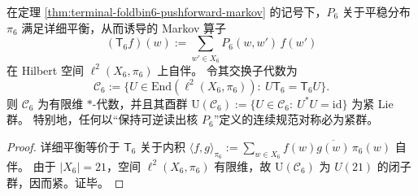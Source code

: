 \begin{corollary}\label{cor:window6-p6-compactness-principle}
在定理 \ref{thm:terminal-foldbin6-pushforward-markov} 的记号下，\(P_6\) 关于平稳分布 \(\pi_6\) 满足详细平衡，从而诱导的 Markov 算子
\[
(\mathsf{T}_6 f)(w):=\sum_{w'\in X_6} P_6(w,w')\,f(w')
\]
在 Hilbert 空间 \(\ell^2(X_6,\pi_6)\) 上自伴。
令其交换子代数为
\[
\mathcal{C}_6:=\bigl\{U\in \mathrm{End}(\ell^2(X_6,\pi_6)):\ U\mathsf{T}_6=\mathsf{T}_6U\bigr\}.
\]
则 \(\mathcal{C}_6\) 为有限维 \(*\)-代数，并且其酉群
\(
\mathrm{U}(\mathcal{C}_6):=\{U\in\mathcal{C}_6:\ U^*U=\mathrm{id}\}
\)
为紧 Lie 群。
特别地，任何以“保持可逆读出核 \(P_6\)”定义的连续规范对称必为紧群。
\end{corollary}
\begin{proof}
详细平衡等价于 \(\mathsf{T}_6\) 关于内积 \(\langle f,g\rangle_{\pi_6}:=\sum_{w\in X_6} f(w)\overline{g(w)}\,\pi_6(w)\) 自伴。
由于 \(|X_6|=21\)，空间 \(\ell^2(X_6,\pi_6)\) 有限维，故 \(\mathrm{U}(\mathcal{C}_6)\) 为 \(U(21)\) 的闭子群，因而紧。证毕。
\end{proof}

